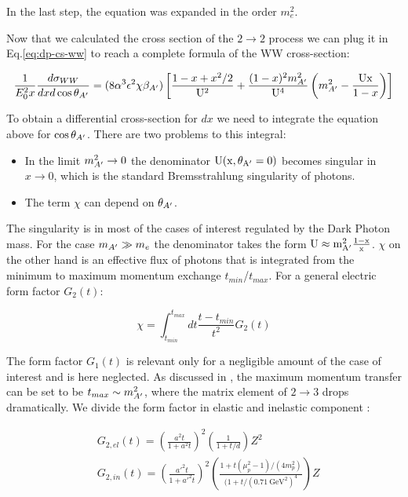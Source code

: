  In the last step, the equation was expanded in the order $m^2_e$.

 Now that we calculated the cross section of the $2 \to 2$ process we can plug it in Eq.\ref{eq:dp-cs-ww} to reach a complete formula of the WW cross-section:

 \begin{equation}
   \label{eq:dp-cs-ww-num}
   \frac{1}{E^2_0 x} \frac{d\sigma_{WW}}{dx d\cos{\theta_{A'}}} = (8 \alpha^3 \epsilon^2 \chi \beta_{A'}) \left[ \frac{1 - x + x^2/2}{\rm{U}^2} + \frac{(1-x)^2m^2_{A'}}{\rm{U}^4} \left(m^2_{A'} - \frac{\rm{U}x}{1 - x} \right) \right]
 \end{equation}

 To obtain a differential cross-section for $dx$ we need to integrate the equation above for $\cos{\theta_{A'}}$. There are two problems to this integral:

 \begin{itemize}
 \item In the limit $m^2_{A'} \to 0$ the denominator $\rm{U}(x, \theta_{A'} = 0)$ becomes singular in $x \to 0$, which is the standard Bremsstrahlung singularity of photons.   
 \item The term $\chi$ can depend on $\theta_{A'}$.
 \end{itemize}

 The singularity is in most of the cases of interest regulated by the Dark Photon mass. For the case $m_{A'} \gg m_e$ the denominator takes the form $\rm{U} \approx m^2_{A'} \frac{1-x}{x}$.
 $\chi$ on the other hand is an effective flux of photons that is integrated from the minimum to maximum momentum exchange $t_{min}$/$t_{max}$. For a general electric form factor $G_2(t)$:

 \begin{equation}
   \label{eq:g-ff}
   \chi = \int^{t_{max}}_{t_{min}} dt \frac{t - t_{min}}{t^2} G_2(t)
 \end{equation}

 The form factor $G_1(t)$ is relevant only for a negligible amount of the case of interest and is here neglected. As discussed in \cite{Kim:1973he,RevModPhys.46.815}, the maximum momentum transfer can be set to be $t_{max} \sim m^2_{A'}$, where the matrix element of $2 \to 3$ drops dramatically. We divide the form factor in elastic and inelastic component \cite{jdb}:

 \begin{align}
   \label{eq:g-ff-el}
   &G_{2,el}(t) = \left( \frac{a^2 t}{1 + a^2t} \right)^2 \left( \frac{1}{1 + t/d}\right) Z^2\\
   \label{eq:g-ff-in}
   &G_{2,in}(t) = \left( \frac{a'^2 t }{1 + a'^2 t} \right)^2 \left( \frac{1 + t (\mu_p^2 -1) / (4m^2_p)}{(1 + t / (\SI{0.71}{\giga\electronvolt\squared})^4} \right) Z
 \end{align}

